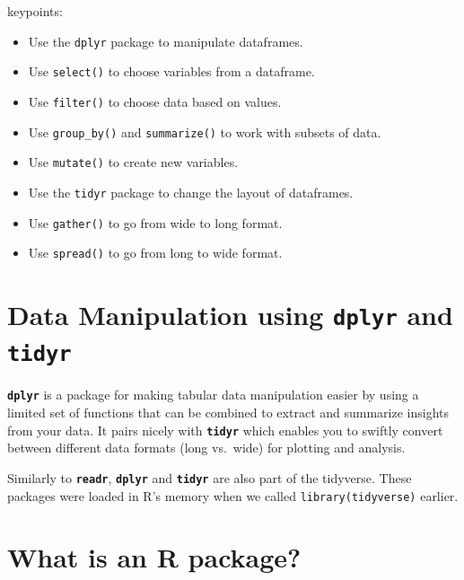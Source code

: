 \documentclass[]{book}
\providecommand{\tightlist}{%
  \setlength{\itemsep}{0pt}\setlength{\parskip}{0pt}}
\begin{document}
keypoints:

\begin{itemize}
\tightlist
\item
  Use the \texttt{dplyr} package to manipulate dataframes.\\
\item
  Use \texttt{select()} to choose variables from a dataframe.\\
\item
  Use \texttt{filter()} to choose data based on values.\\
\item
  Use \texttt{group\_by()} and \texttt{summarize()} to work with subsets
  of data.\\
\item
  Use \texttt{mutate()} to create new variables.\\
\item
  Use the \texttt{tidyr} package to change the layout of dataframes.\\
\item
  Use \texttt{gather()} to go from wide to long format.\\
\item
  Use \texttt{spread()} to go from long to wide format.
\end{itemize}

\section{\texorpdfstring{Data Manipulation using \textbf{\texttt{dplyr}}
and
\textbf{\texttt{tidyr}}}{Data Manipulation using dplyr and tidyr}}\label{data-manipulation-using-dplyr-and-tidyr}

\textbf{\texttt{dplyr}} is a package for making tabular data
manipulation easier by using a limited set of functions that can be
combined to extract and summarize insights from your data. It pairs
nicely with \textbf{\texttt{tidyr}} which enables you to swiftly convert
between different data formats (long vs.~wide) for plotting and
analysis.

Similarly to \textbf{\texttt{readr}}, \textbf{\texttt{dplyr}} and
\textbf{\texttt{tidyr}} are also part of the tidyverse. These packages
were loaded in R's memory when we called \texttt{library(tidyverse)}
earlier.

\section{What is an R package?}\label{what-is-an-r-package}
\end{document}
